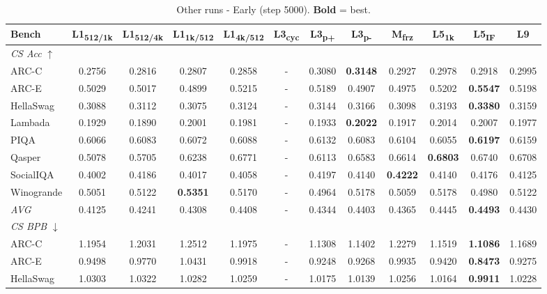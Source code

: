 \begin{table}[htbp]
\centering
\setlength{\tabcolsep}{2.5pt}
\small
\caption{Other runs - Early (step 5000). \textbf{Bold} = best.}
\label{tab:other_early}
\begin{tabular}{lccccccccccc}
\toprule
Bench & L1\textsubscript{512/1k} & L1\textsubscript{512/4k} & L1\textsubscript{1k/512} & L1\textsubscript{4k/512} & L3\textsubscript{cyc} & L3\textsubscript{p+} & L3\textsubscript{p-} & M\textsubscript{frz} & L5\textsubscript{1k} & L5\textsubscript{IF} & L9 \\
\midrule
\multicolumn{12}{l}{\textit{CS Acc} $\uparrow$} \\
ARC-C & 0.2756 & 0.2816 & 0.2807 & 0.2858 & - & 0.3080 & \textbf{0.3148} & 0.2927 & 0.2978 & 0.2918 & 0.2995 \\
ARC-E & 0.5029 & 0.5017 & 0.4899 & 0.5215 & - & 0.5189 & 0.4907 & 0.4975 & 0.5202 & \textbf{0.5547} & 0.5198 \\
HellaSwag & 0.3088 & 0.3112 & 0.3075 & 0.3124 & - & 0.3144 & 0.3166 & 0.3098 & 0.3193 & \textbf{0.3380} & 0.3159 \\
Lambada & 0.1929 & 0.1890 & 0.2001 & 0.1981 & - & 0.1933 & \textbf{0.2022} & 0.1917 & 0.2014 & 0.2007 & 0.1977 \\
PIQA & 0.6066 & 0.6083 & 0.6072 & 0.6088 & - & 0.6132 & 0.6083 & 0.6104 & 0.6055 & \textbf{0.6197} & 0.6159 \\
Qasper & 0.5078 & 0.5705 & 0.6238 & 0.6771 & - & 0.6113 & 0.6583 & 0.6614 & \textbf{0.6803} & 0.6740 & 0.6708 \\
SocialIQA & 0.4002 & 0.4186 & 0.4017 & 0.4058 & - & 0.4197 & 0.4140 & \textbf{0.4222} & 0.4140 & 0.4176 & 0.4125 \\
Winogrande & 0.5051 & 0.5122 & \textbf{0.5351} & 0.5170 & - & 0.4964 & 0.5178 & 0.5059 & 0.5178 & 0.4980 & 0.5122 \\
\textit{AVG} & 0.4125 & 0.4241 & 0.4308 & 0.4408 & - & 0.4344 & 0.4403 & 0.4365 & 0.4445 & \textbf{0.4493} & 0.4430 \\
\midrule
\multicolumn{12}{l}{\textit{CS BPB} $\downarrow$} \\
ARC-C & 1.1954 & 1.2031 & 1.2512 & 1.1975 & - & 1.1308 & 1.1402 & 1.2279 & 1.1519 & \textbf{1.1086} & 1.1689 \\
ARC-E & 0.9498 & 0.9770 & 1.0431 & 0.9918 & - & 0.9248 & 0.9268 & 0.9935 & 0.9420 & \textbf{0.8473} & 0.9275 \\
HellaSwag & 1.0303 & 1.0322 & 1.0282 & 1.0259 & - & 1.0175 & 1.0139 & 1.0256 & 1.0164 & \textbf{0.9911} & 1.0228 \\

\end{tabular}
\end{table}
